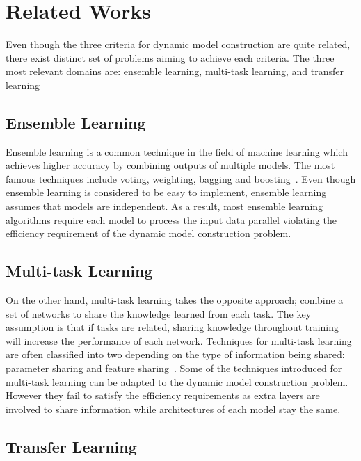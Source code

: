\documentclass{article}
\begin{document}
\section{Related Works}

Even though the three criteria for dynamic model construction are quite related, there exist distinct set of problems aiming to achieve each criteria. The three most relevant domains are: ensemble learning, multi-task learning, and transfer learning

\subsection{Ensemble Learning}
Ensemble learning is a common technique in the field of machine learning which achieves higher accuracy by combining outputs of multiple models. The most famous techniques include voting, weighting, bagging and boosting~\cite{dietterich2000ensemble, breiman1996bagging, freund1996experiments}. Even though ensemble learning is considered to be easy to implement, ensemble learning assumes that models are independent. As a result, most ensemble learning algorithms require each model to process the input data parallel violating the efficiency requirement of the dynamic model construction problem.

\subsection{Multi-task Learning}
On the other hand, multi-task learning takes the opposite approach; combine a set of networks to share the knowledge learned from each task. The key assumption is that if tasks are related, sharing knowledge throughout training will increase the performance of each network. Techniques for multi-task learning are often classified into two depending on the type of information being shared: parameter sharing and feature sharing~\cite{ruder2017overview, Caruana1993MultitaskLA, duong2015low, lu2017fully}. Some of the techniques introduced for multi-task learning can be adapted to the dynamic model construction problem. However they fail to satisfy the efficiency requirements as extra layers are involved to share information while architectures of each model stay the same.

\subsection{Transfer Learning}
\end{document}
